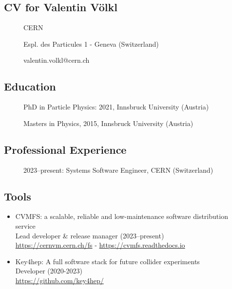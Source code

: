 
\subsection{CV for Valentin V\"olkl}
\begin{description}
\item[] CERN
\item[] Espl. des Particules 1 - Geneva (Switzerland)
\item[] valentin.volkl@cern.ch
\end{description}

\subsection*{Education}
\begin{description}
    \item[] PhD in Particle Physics: 2021, Innsbruck University (Austria)
    \item[] Masters in Physics, 2015, Innsbruck University (Austria)
\end{description}

\subsection*{Professional Experience}
\begin{description}
    \item[] 2023--present: Systems Software Engineer, CERN (Switzerland)
\end{description}

\subsection*{Tools}

\begin{itemize}
    \item[] CVMFS: a scalable, reliable and low-maintenance software distribution service
    \\Lead developer \& release manager (2023--present)
    \\{\small{\url{https://cernvm.cern.ch/fs} - \url{https://cvmfs.readthedocs.io}}}
    \item[] Key4hep: A full software stack for future collider experiments\\Developer (2020-2023)\\{\small{ \url{https://github.com/key4hep/}}}
\end{itemize}


